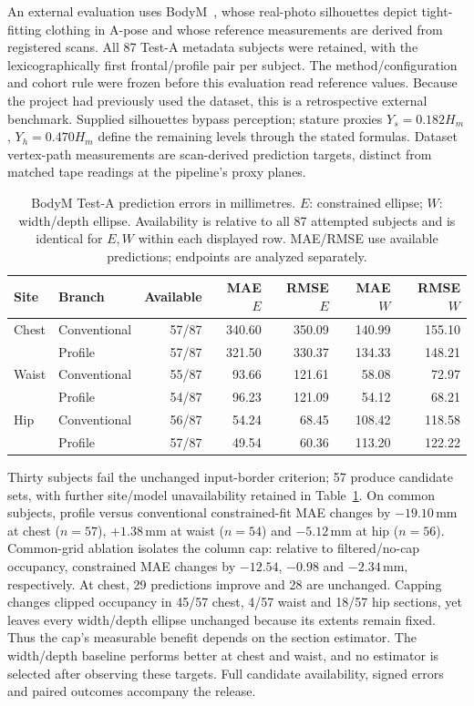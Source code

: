 \documentclass[11pt,a4paper]{article}
\begin{document}
An external evaluation uses BodyM~\cite{ruiz2022bodym}, whose real-photo silhouettes depict tight-fitting clothing in A-pose and whose reference measurements are derived from registered scans. All 87 Test-A metadata subjects were retained, with the lexicographically first frontal/profile pair per subject. The method/configuration and cohort rule were frozen before this evaluation read reference values. Because the project had previously used the dataset, this is a retrospective external benchmark. Supplied silhouettes bypass perception; stature proxies $Y_s=0.182H_m$, $Y_h=0.470H_m$ define the remaining levels through the stated formulas. Dataset vertex-path measurements are scan-derived prediction targets, distinct from matched tape readings at the pipeline's proxy planes.

\begin{table}[htbp]
\centering\small
\caption{BodyM Test-A prediction errors in millimetres. $E$: constrained ellipse; $W$: width/depth ellipse. Availability is relative to all 87 attempted subjects and is identical for $E,W$ within each displayed row. MAE/RMSE use available predictions; endpoints are analyzed separately.}
\label{tab:bodym}
\begin{tabular}{llrrrrr}
\toprule
Site & Branch & Available & MAE $E$ & RMSE $E$ & MAE $W$ & RMSE $W$\\
\midrule
Chest & Conventional &57/87&340.60&350.09&140.99&155.10\\
      & Profile      &57/87&321.50&330.37&134.33&148.21\\
Waist & Conventional &55/87&93.66&121.61&58.08&72.97\\
      & Profile      &54/87&96.23&121.09&54.12&68.21\\
Hip   & Conventional &56/87&54.24&68.45&108.42&118.58\\
      & Profile      &57/87&49.54&60.36&113.20&122.22\\
\bottomrule
\end{tabular}
\end{table}

Thirty subjects fail the unchanged input-border criterion; 57 produce candidate sets, with further site/model unavailability retained in Table~\ref{tab:bodym}. On common subjects, profile versus conventional constrained-fit MAE changes by $-19.10$\,mm at chest ($n=57$), $+1.38$\,mm at waist ($n=54$) and $-5.12$\,mm at hip ($n=56$). Common-grid ablation isolates the column cap: relative to filtered/no-cap occupancy, constrained MAE changes by $-12.54$, $-0.98$ and $-2.34$\,mm, respectively. At chest, 29 predictions improve and 28 are unchanged. Capping changes clipped occupancy in 45/57 chest, 4/57 waist and 18/57 hip sections, yet leaves every width/depth ellipse unchanged because its extents remain fixed. Thus the cap's measurable benefit depends on the section estimator. The width/depth baseline performs better at chest and waist, and no estimator is selected after observing these targets. Full candidate availability, signed errors and paired outcomes accompany the release.
\end{document}
